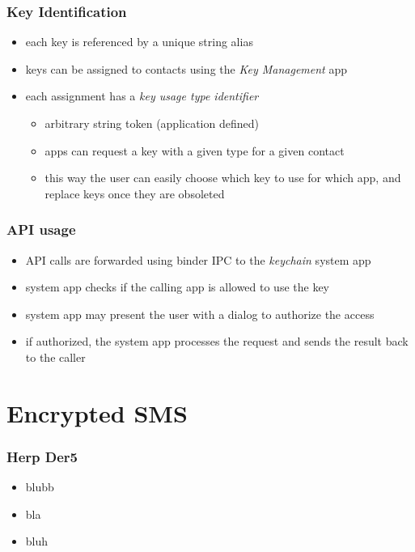 \documentclass{beamer}
\begin{document}
	\begin{frame}
		\frametitle{Key Identification}
		\begin{itemize}
			\item each key is referenced by a unique string alias
			\item keys can be assigned to contacts using the {\em Key Management} app
			\item each assignment has a {\em key usage type identifier}
				\begin{itemize}
					\item arbitrary string token (application defined)
					\item apps can request a key with a given type for a given contact
					\item this way the user can easily choose which key to use for which app, and replace keys once they are obsoleted
				\end{itemize}
		\end{itemize}
	\end{frame}

	\begin{frame}
		\frametitle{API usage}
		\begin{itemize}
			\item API calls are forwarded using binder IPC to the {\em keychain} system app
			\item system app checks if the calling app is allowed to use the key
			\item system app may present the user with a dialog to authorize the access
			\item if authorized, the system app processes the request and sends the result back to the caller
		\end{itemize}
	\end{frame}

\section{Encrypted SMS}
	\begin{frame}
		\tableofcontents[currentsection]
	\end{frame}
	\begin{frame}
	\frametitle{Herp Der5}
		\begin{itemize}
			\item blubb
			\item bla
			\item bluh
		\end{itemize}
	\end{frame}
	
\end{document}
